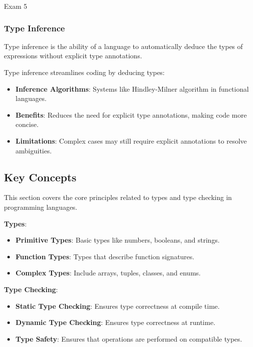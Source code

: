 \begin{examnotes}{Exam 5}
    \subsubsection*{Type Inference}
    
    Type inference is the ability of a language to automatically deduce the types of expressions without explicit type annotations.
    
    \begin{highlight}
        Type inference streamlines coding by deducing types:
        \begin{itemize}
            \item \textbf{Inference Algorithms}: Systems like Hindley-Milner algorithm in functional languages.
            \item \textbf{Benefits}: Reduces the need for explicit type annotations, making code more concise.
            \item \textbf{Limitations}: Complex cases may still require explicit annotations to resolve ambiguities.
        \end{itemize}
    \end{highlight}
    
    \subsection*{Key Concepts}
    
    \begin{highlight}
        This section covers the core principles related to types and type checking in programming languages.
    
        \textbf{Types}:
        \begin{itemize}
            \item \textbf{Primitive Types}: Basic types like numbers, booleans, and strings.
            \item \textbf{Function Types}: Types that describe function signatures.
            \item \textbf{Complex Types}: Include arrays, tuples, classes, and enums.
        \end{itemize}
        
        \textbf{Type Checking}:
        \begin{itemize}
            \item \textbf{Static Type Checking}: Ensures type correctness at compile time.
            \item \textbf{Dynamic Type Checking}: Ensures type correctness at runtime.
            \item \textbf{Type Safety}: Ensures that operations are performed on compatible types.
        \end{itemize}
        

\end{highlight}
\end{examnotes}
